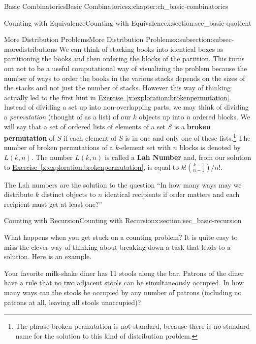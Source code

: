 \documentclass[oneside,10pt,]{book}
\newcommand{\terminology}[1]{\textbf{#1}}
\numberwithin{equation}{chapter}
\begin{document}
\begin{chapterptx}{Basic Combinatorics}{}{Basic Combinatorics}{}{}{x:chapter:ch_basic-combinatorics}
\begin{sectionptx}{Counting with Equivalence}{}{Counting with Equivalence}{}{}{x:section:sec_basic-quotient}
\begin{subsectionptx}{More Distribution Problems}{}{More Distribution Problems}{}{}{x:subsection:subsec-moredistributions}
We can think of stacking books into identical boxes as partitioning the books and then ordering the blocks of the partition. This turns out not to be a useful computational way of visualizing the problem because the number of ways to order the books in the various stacks depends on the sizes of the stacks and not just the number of stacks. However this way of thinking actually led to the first hint in \hyperref[x:exploration:brokenpermutation]{Exercise~\ref{x:exploration:brokenpermutation}}. Instead of dividing a set up into non-overlapping parts, we may think of dividing a \emph{permutation} (thought of as a list) of our \(k\) objects up into \(n\) ordered blocks. We will say that a set of ordered lists of elements of a set \(S\) is a \terminology{broken permutation}   of \(S\) if each element of \(S\) is in one and only one of these lists.\footnote{The phrase broken permutation is not standard, because there is no standard name for the solution to this kind  of distribution problem.\label{g:fn:idm2626}} The number of broken permutations of a \(k\)-element set with \(n\) blocks is denoted by \(L(k,n)\). The number \(L(k,n)\) is called a \terminology{Lah Number} and, from our solution to \hyperref[x:exploration:brokenpermutation]{Exercise~\ref{x:exploration:brokenpermutation}}, is equal to \(k!\binom{k-1}{n-1}/n!\).%
\par
The Lah numbers are the solution to the question ``In how many ways may we distribute \(k\) distinct objects to \(n\) identical recipients if order matters and each recipient must get at least one?''%
\end{subsectionptx}
\end{sectionptx}
%
%
\typeout{************************************************}
\typeout{************************************************}
%
\begin{sectionptx}{Counting with Recursion}{}{Counting with Recursion}{}{}{x:section:sec_basic-recursion}
\begin{introduction}{}%
What happens when you get stuck on a counting problem?  It is quite easy to miss the clever way of thinking about breaking down a task that leads to a solution.  Here is an example.%
\par
Your favorite milk-shake diner has 11 stools along the bar.  Patrons of the diner have a rule that no two adjacent stools can be simultaneously occupied.  In how many ways can the stools be occupied by any number of patrons (including no patrons at all, leaving all stools unoccupied)?%

\end{introduction}
\end{sectionptx}
\end{chapterptx}
\end{document}
